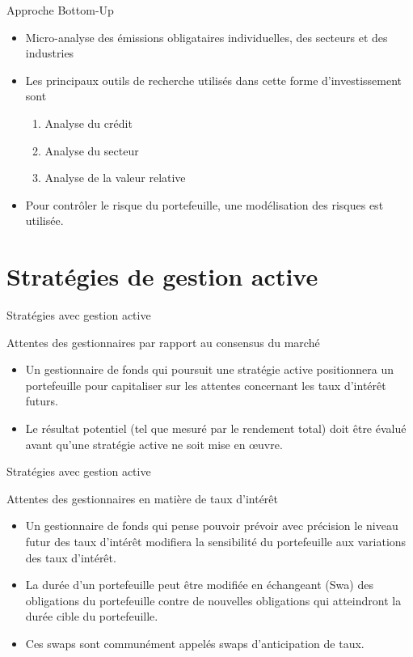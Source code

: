 \documentclass[10pt,a4paper]{beamer}
\begin{document}
\begin{frame}{Approche Bottom-Up}
\begin{itemize}[label=\bullet]
\item Micro-analyse des émissions obligataires individuelles, des secteurs et des industries
\item Les principaux outils de recherche utilisés dans cette forme d'investissement sont
\begin{enumerate}[label=\arabic*)]
\item Analyse du crédit
\item Analyse du secteur 
\item Analyse de la valeur relative
\end{enumerate}
\item Pour contrôler le risque du portefeuille, une modélisation des risques est utilisée.
\end{itemize}
\end{frame}

\section{Stratégies de gestion active}
\begin{frame}{Stratégies avec gestion active}
\begin{block}{Attentes des gestionnaires par rapport au consensus du marché}
\begin{itemize}[label=\bullet]
\item Un gestionnaire de fonds qui poursuit une stratégie active positionnera un portefeuille pour capitaliser sur les attentes concernant les taux d'intérêt futurs.
\item Le résultat potentiel (tel que mesuré par le rendement total) doit être évalué avant qu'une stratégie active ne soit mise en œuvre.
\end{itemize}
\end{block}
\end{frame}

\begin{frame}{Stratégies avec gestion active}
\begin{block}{Attentes des gestionnaires en matière de taux d'intérêt}
\begin{itemize}[label=\bullet]
\item Un gestionnaire de fonds qui pense pouvoir prévoir avec précision le niveau futur des taux d’intérêt modifiera la sensibilité du portefeuille aux variations des taux d’intérêt.
\item La durée d’un portefeuille peut être modifiée en échangeant (Swa) des obligations du portefeuille contre de nouvelles obligations qui atteindront la durée cible du portefeuille.
\item Ces swaps sont communément appelés swaps d'anticipation de taux.
\end{itemize}
\end{block}
\end{frame}
\end{document}
